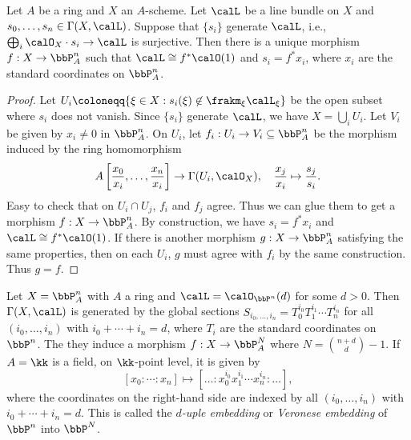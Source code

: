     \begin{theorem}\label{thm:morphism_to_projective_space}
        Let \(A\) be a ring and \(X\) an \(A\)-scheme.
        Let \(\calL\) be a line bundle on \(X\) and \(s_0,\ldots,s_n\in\Gamma(X,\calL)\).
        Suppose that \(\{s_i\}\) generate \(\calL\), i.e., \(\bigoplus_i \calO_X\cdot s_i \to \calL\) is surjective.
        Then there is a unique morphism \(f:X\to \bbP^n_A\) such that \(\calL\cong f^*\calO(1)\) and \(s_i=f^*x_i\), where \(x_i\) are the standard coordinates on \(\bbP^n_A\). 
    \end{theorem}
    \begin{proof}
        Let \(U_i\coloneqq \{\xi \in X: s_i(\xi) \not\in \frakm_\xi \calL_\xi\}\) be the open subset where \(s_i\) does not vanish.
        Since \(\{s_i\}\) generate \(\calL\), we have \(X=\bigcup_i U_i\).
        Let \(V_i\) be given by \(x_i \neq 0\) in \(\bbP^n_A\).
        On \(U_i\), let \(f_i:U_i\to V_i \subseteq \bbP^n_A\) be the morphism induced by the ring homomorphism
        \[ A\left[\frac{x_0}{x_i},\ldots,\frac{x_n}{x_i}\right] \to \Gamma(U_i,\calO_X), \quad \frac{x_j}{x_i} \mapsto \frac{s_j}{s_i}. \]
        Easy to check that on \(U_i\cap U_j\), \(f_i\) and \(f_j\) agree.
        Thus we can glue them to get a morphism \(f:X\to \bbP^n_A\).
        By construction, we have \(s_i=f^*x_i\) and \(\calL\cong f^*\calO(1)\).
        If there is another morphism \(g:X\to \bbP^n_A\) satisfying the same properties, then on each \(U_i\), \(g\) must agree with \(f_i\) by the same construction.
        Thus \(g=f\).
    \end{proof}

    \begin{example}\label{eg:d-uple_embedding_or_Veronese_embedding}
        Let \(X=\bbP^n_A\) with \(A\) a ring and \(\calL=\calO_{\bbP^n}(d)\) for some \(d>0\).
        Then \(\Gamma(X,\calL)\) is generated by the global sections \(S_{i_0,\ldots,i_n}=T_0^{i_0}T_1^{i_1}\cdots T_n^{i_n}\) for all \((i_0,\ldots,i_n)\) with \(i_0+\cdots+i_n=d\), where \(T_i\) are the standard coordinates on \(\bbP^n\).
        The they induce a morphism \(f:X\to \bbP^N_A\) where \(N=\binom{n+d}{d}-1\).
        If \(A=\kk\) is a field, on \(\kk\)-point level, it is given by
        \[
            [x_0:\cdots:x_n] \mapsto [\ldots:x_0^{i_0}x_1^{i_1}\cdots x_n^{i_n}:\ldots],
        \]
        where the coordinates on the right-hand side are indexed by all \((i_0,\ldots,i_n)\) with \(i_0+\cdots+i_n=d\).
        This is called the \emph{\(d\)-uple embedding} or \emph{Veronese embedding} of \(\bbP^n\) into \(\bbP^N\).
    \end{example}

